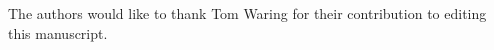 \documentclass[aoas]{imsart}
\begin{document}
%
%

\begin{acks}[Acknowledgments]
The authors would like to thank Tom Waring for their contribution to editing this manuscript.
\end{acks}
%
\end{document}
